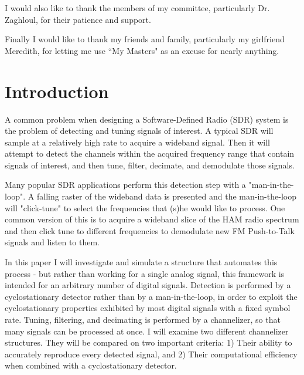 \documentclass[12pt]{report}
\begin{document}
I would also like to thank the members of my committee, particularly Dr.
Zaghloul, for their patience and support.

Finally I would like to thank my friends and family, particularly my girlfriend
Meredith, for letting me use ``My Masters" as an excuse for nearly anything.

\tableofcontents
\pagebreak

\listoffigures
\pagebreak


\pagestyle{myheadings}

\chapter{Introduction}
\label{sec:intro}

A common problem when designing a Software-Defined Radio (SDR) system is the
problem of detecting and tuning signals of interest. A typical SDR will sample
at a relatively high rate to acquire a wideband signal. Then it will attempt to
detect the channels within the acquired frequency range that contain signals of
interest, and then tune, filter, decimate, and demodulate those signals. 

Many popular SDR applications perform this detection step with
a "man-in-the-loop".  A falling raster of the wideband data is presented and
the man-in-the-loop will "click-tune" to select  the frequencies that (s)he
would like to process. One common version of this is to acquire a wideband
slice of the HAM radio spectrum and then click tune to different frequencies to
demodulate new FM Push-to-Talk signals and listen to them.

In this paper I will investigate and simulate a structure that automates this
process - but rather than working for a single analog signal, this framework is
intended for an arbitrary number of digital signals. Detection is performed by
a cyclostationary detector rather than by a man-in-the-loop, in order to
exploit the cyclostationary properties exhibited by most digital signals with
a fixed symbol rate.  Tuning, filtering, and decimating is performed by
a channelizer, so that many signals can be processed at once.  I will examine
two different channelizer structures. They will be compared on two important
criteria:
1) Their ability to accurately reproduce every detected signal, and 2) Their
computational efficiency when combined with a cyclostationary detector.
\end{document}
